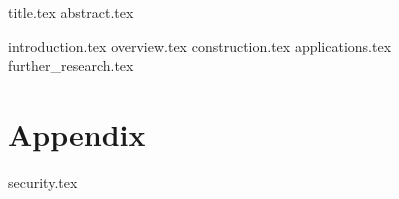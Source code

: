 \documentclass[11pt]{llncs}
\begin{document}
{title.tex}
\thispagestyle{plain}
{abstract.tex}

{introduction.tex}
{overview.tex}
{construction.tex}
{applications.tex}
{further_research.tex}

\appendix
\section*{Appendix}
{security.tex}



\end{document}
